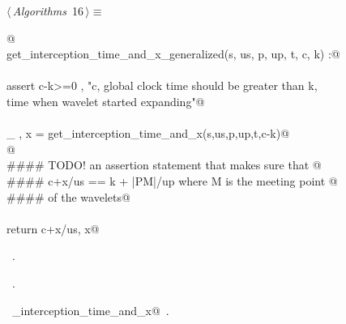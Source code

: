 \documentclass[10pt, english, oneside]{report}
\begin{document}
\begin{flushleft} \small
\begin{minipage}{\linewidth}\label{scrap15}\raggedright\small
{} $\langle\,${\itshape Algorithms}\nobreak\ {\footnotesize {16}}$\,\rangle\equiv$
\vspace{-1ex}
\begin{list}{}{} \item
\mbox{}\verb@ @\\
\mbox{}\verb@def get_interception_time_and_x_generalized(s, us, p, up, t, c, k) :@\\
\mbox{}\verb@@\\
\mbox{}\verb@    assert c-k>=0 , "c, global clock time should be greater than k,\@\\
\mbox{}\verb@                    time when wavelet started expanding"@\\
\mbox{}\verb@@\\
\mbox{}\verb@    _ , x = get_interception_time_and_x(s,us,p,up,t,c-k)@\\
\mbox{}\verb@ @\\
\mbox{}\verb@    #### TODO! an assertion statement that makes sure that @\\
\mbox{}\verb@    #### c+x/us == k + |PM|/up where M is the meeting point @\\
\mbox{}\verb@    #### of the wavelets@\\
\mbox{}\verb@@\\
\mbox{}\verb@    return c+x/us, x@\\
\mbox{}\verb@@{\NWsep}
\end{list}
\vspace{-1.5ex}
\footnotesize
\begin{list}{}{\setlength{\itemsep}{-\parsep}\setlength{\itemindent}{-\leftmargin}}
\item \NWtxtMacroDefBy\ .
\item \NWtxtMacroRefIn\ .
\item \NWtxtIdentsUsed\nobreak\  \verb@get_interception_time_and_x@\nobreak\ .
\item{}
\end{list}
\end{minipage}\vspace{4ex}
\end{flushleft}
\end{document}
